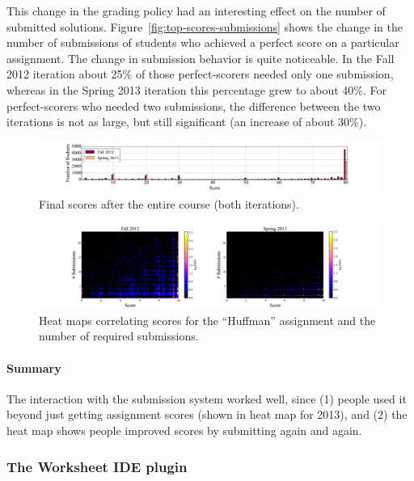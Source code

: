 \documentclass{sig-alternate}
\begin{document}
This change in the grading policy had an interesting effect on the number of
submitted solutions. Figure~\ref{fig:top-scores-submissions} shows the change
in the number of submissions of students who achieved a perfect score on a
particular assignment. The change in submission behavior is quite noticeable.
In the Fall 2012 iteration about 25\% of those perfect-scorers needed only one
submission, whereas in the Spring 2013 iteration this percentage grew to about
40\%. For perfect-scorers who needed two submissions, the difference between
the two iterations is not as large, but still significant (an increase of
about 30\%).

\begin{figure}[ht!]
  \centering
  \includegraphics[width=\textwidth]{plots/final-scores.pdf}
  \caption{Final scores after the entire course (both iterations).}
  \label{fig:final-scores}
\end{figure}

\begin{figure}[ht!]
  \centering
  \includegraphics[width=\textwidth]{plots/score-2d-histogram-fall2012-spring2013.pdf}
  \caption{Heat maps correlating scores for the ``Huffman'' assignment and the number
  of required submissions.}
  \label{fig:2d-histogram}
\end{figure}

\paragraph{Summary}

The interaction with the submission system worked well, since (1) people used
it beyond just getting assignment scores (shown in heat map for 2013), and (2)
the heat map shows people improved scores by submitting again and again.


\subsubsection{The Worksheet IDE plugin}
\end{document}

